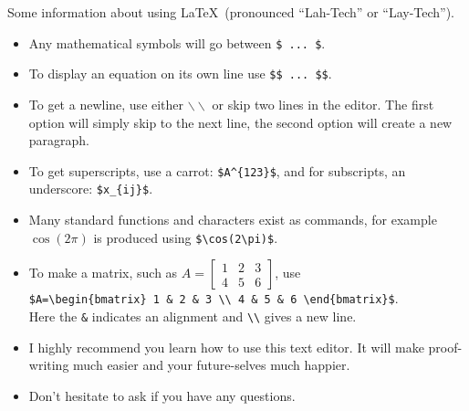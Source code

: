 \documentclass[12pt]{article}
\begin{document}
\vskip 1in
Some information about using \LaTeX\ (pronounced ``Lah-Tech'' or ``Lay-Tech'').
    \begin{itemize}
		\item Any mathematical symbols will go between \verb|$ ... $|.
		\item To display an equation on its own line use \verb|$$ ... $$|.
		\item To get a newline, use either $\backslash\backslash$ or skip two lines in the editor.  The first option will simply skip to the next line, the second option will create a new paragraph.
		\item To get superscripts, use a carrot: \verb|$A^{123}$|, and for subscripts, an underscore: \verb|$x_{ij}$|.
		\item Many standard functions and characters exist as commands, for example $\cos(2\pi)$ is produced using \verb|$\cos(2\pi)$|.
		\item To make a matrix, such as $A=\begin{bmatrix}1&2&3\\4&5&6\end{bmatrix}$, use\\ \verb|$A=\begin{bmatrix} 1 & 2 & 3 \\ 4 & 5 & 6 \end{bmatrix}$|.\\ Here the \verb|&| indicates an alignment and \verb|\\| gives a new line.
		\item I highly recommend you learn how to use this text editor.  It will make proof-writing much easier and your future-selves much happier.
		\item Don't hesitate to ask if you have any questions.
	\end{itemize}
\end{document}
